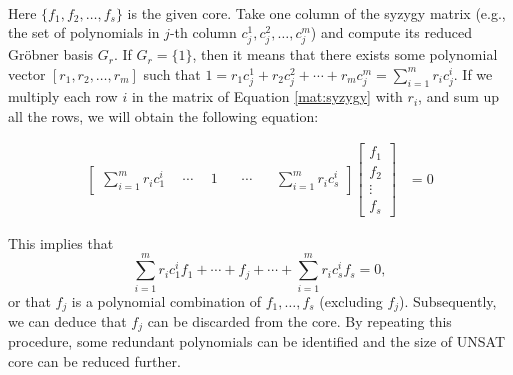 \ \\
 Here $\{f_1,f_2,\dots,f_s\}$ is the given core.
 Take one column of the syzygy matrix (e.g., the set of polynomials in $j$-th column
 $c_j^1, c_j^2, \dots, c_j^m$)  and compute its reduced Gr\"obner
 basis $G_r$. If $G_r = \{1\}$, then it means that there exists some
 polynomial vector  $[r_1,r_2,\dots,r_m]$ such that $1 = r_1c_j^1 +
 r_2c_j^2 + \cdots + r_mc_j^m = \sum_{i=1}^m r_ic_j^i.$ 
 If we multiply each row $i$ in the matrix of Equation \ref{mat:syzygy}
 with $r_i$, and sum up all the rows, we will obtain the
 following equation: 
\vspace{-0.2in}
 \begin{center}
\begin{align}
   \begin{bmatrix}
           \sum_{i=1}^m r_ic_1^i & ~~\cdots & ~~ 1 ~~ & ~~ \cdots ~~ & ~~\sum_{i=1}^m r_ic_s^i
         \end{bmatrix}
    \begin{bmatrix}
           f_{1} \\
           f_{2} \\
           \vdots \\
           f_{s}
         \end{bmatrix}
         &= 0
  \end{align}

\end{center}

This implies that 
 $$\sum_{i=1}^m r_ic_1^if_1 + \cdots + f_j
 +\cdots + \sum_{i=1}^m r_ic_s^if_s = 0,$$
or that $f_j$ is a polynomial combination of
$f_1,\dots,f_s$ (excluding $f_j$). Subsequently, we can deduce that $f_j$ can be
discarded from the core. By repeating this procedure, some redundant
polynomials can be identified and the size of UNSAT core can be reduced
further. 

